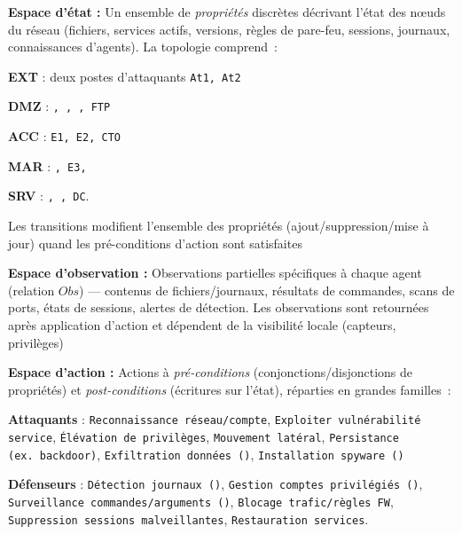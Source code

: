 \begin{enumerate*}[label={\roman*)}, itemjoin={; \quad}]
    \item \textbf{Espace d'état :} Un ensemble de \emph{propriétés} discrètes décrivant l’état des nœuds du réseau (fichiers, services actifs, versions, règles de pare-feu, sessions, journaux, connaissances d’agents). La topologie comprend~:
    \begin{enumerate*}[label={\alph*)}, itemjoin={; \ }]
        \item \textbf{EXT} : deux postes d’attaquants \texttt{At1, At2}
        \item \textbf{DMZ} : \texttt{, , , FTP}
        \item \textbf{ACC} : \texttt{E1, E2, CTO}
        \item \textbf{MAR} : \texttt{, E3, }
        \item \textbf{SRV} : \texttt{, , DC}.
    \end{enumerate*}
    Les transitions modifient l’ensemble des propriétés (ajout/suppression/mise à jour) quand les pré-conditions d’action sont satisfaites
    \item \textbf{Espace d'observation :} Observations partielles spécifiques à chaque agent (relation $Obs$) — contenus de fichiers/journaux, résultats de commandes, scans de ports, états de sessions, alertes de détection. Les observations sont retournées après application d’action et dépendent de la visibilité locale (capteurs, privilèges)
    \item \textbf{Espace d'action :} Actions à \emph{pré-conditions} (conjonctions/disjonctions de propriétés) et \emph{post-conditions} (écritures sur l’état), réparties en grandes familles~:
    \begin{enumerate*}[label={\alph*)}, itemjoin={; \ }]
        \item \textbf{Attaquants} : \texttt{Reconnaissance réseau/compte}, \texttt{Exploiter vulnérabilité service}, \texttt{Élévation de privilèges}, \texttt{Mouvement latéral}, \texttt{Persistance (ex.~backdoor)}, \texttt{Exfiltration données ()}, \texttt{Installation spyware ()}
        \item \textbf{Défenseurs} : \texttt{Détection journaux ()}, \texttt{Gestion comptes privilégiés ()}, \texttt{Surveillance commandes/arguments ()}, \texttt{Blocage trafic/règles FW}, \texttt{Suppression sessions malveillantes}, \texttt{Restauration services}.
    \end{enumerate*}

\end{enumerate*}
